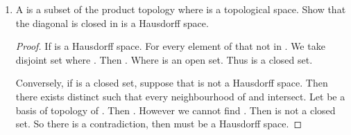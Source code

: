 \begin{enumerate}
\begin{proof}
            Suppose that . Then
            \begin{eqnarray*}
                  \exists U_{0} \cap (A-B) = \emptyset
            \end{eqnarray*}

            Thus,
            \begin{eqnarray*}
                  U_{0} \cap A \subseteq B
            \end{eqnarray*}

            Thus,
            \begin{eqnarray*}
                  U_{1} \cap B &=& \emptyset \\
                  U_{1} \cap U_{0} \cap A &=& \emptyset
            \end{eqnarray*}

            As  is an open set containing , so there is contradiction with . Thus .
      \end{proof}

      \item A \label{def:Diagonal} is a subset  of the product topology  where  is a topological space. Show that the diagonal is closed in  \ioi {} is a Hausdorff space.

      \begin{proof}
            If  is a Hausdorff space. For every element  of  that not in \mt{\Delta}. We take disjoint set  where . Then . Where  is an open set. Thus \mt{\Delta} is a closed set.

            Conversely, if \mt{\Delta} is a closed set, suppose that  is not a Hausdorff space. Then there exists distinct  such that every neighbourhood of  and  intersect. Let  be a basis of topology of . Then . However we cannot find . Then \mt{\Delta} is not a closed set. So there is a contradiction, then  must be a Hausdorff space.
      \end{proof}


\end{enumerate}

